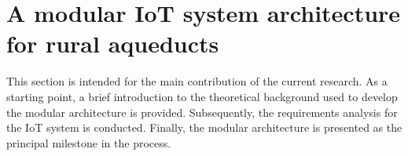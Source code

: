 \documentclass[conference]{IEEEtran}
\begin{document}

\section{A modular IoT system architecture for rural aqueducts}
This section is intended for the main contribution of the current research. As a starting point, a brief introduction to the theoretical background used to develop the modular architecture is provided. Subsequently, the requirements analysis for the IoT system is conducted. Finally, the modular architecture is presented as the principal milestone in the process. 
\end{document}
